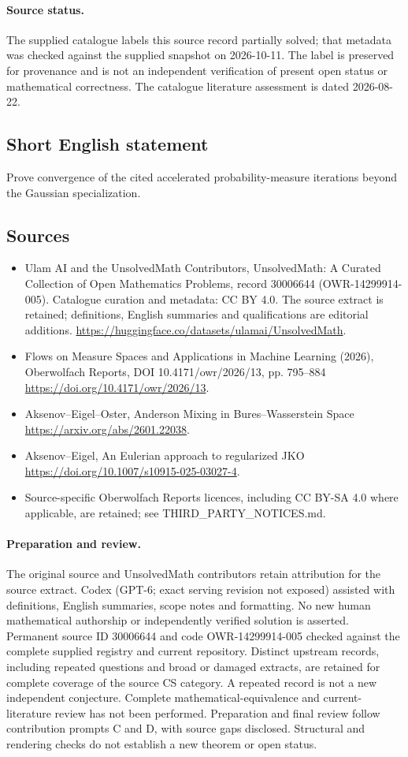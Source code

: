 \documentclass[11pt]{article}
\begin{document}
\paragraph{Source status.}
The supplied catalogue labels this source record partially solved; that metadata was checked against the supplied snapshot on 2026-10-11. The label is preserved for provenance and is not an independent verification of present open status or mathematical correctness. The catalogue literature assessment is dated 2026-08-22.
\subsection{Short English statement}
Prove convergence of the cited accelerated probability-measure iterations beyond the Gaussian specialization.
\subsection{Sources}
\begin{itemize}
\item[S1] Ulam AI and the UnsolvedMath Contributors, UnsolvedMath: A Curated Collection of Open Mathematics Problems, record 30006644 (OWR-14299914-005). Catalogue curation and metadata: CC BY 4.0. The source extract is retained; definitions, English summaries and qualifications are editorial additions.
\url{https://huggingface.co/datasets/ulamai/UnsolvedMath}.
\item[S2] Flows on Measure Spaces and Applications in Machine Learning (2026), Oberwolfach Reports, DOI 10.4171/owr/2026/13, pp. 795--884
\url{https://doi.org/10.4171/owr/2026/13}.
\item[S3] Aksenov--Eigel--Oster, Anderson Mixing in Bures--Wasserstein Space
\url{https://arxiv.org/abs/2601.22038}.
\item[S4] Aksenov--Eigel, An Eulerian approach to regularized JKO
\url{https://doi.org/10.1007/s10915-025-03027-4}.
\item Source-specific Oberwolfach Reports licences, including CC BY-SA 4.0 where applicable, are retained; see THIRD\_PARTY\_NOTICES.md.
\end{itemize}
\paragraph{Preparation and review.}
The original source and UnsolvedMath contributors retain attribution for the source extract. Codex (GPT-6; exact serving revision not exposed) assisted with definitions, English summaries, scope notes and formatting. No new human mathematical authorship or independently verified solution is asserted. Permanent source ID 30006644 and code OWR-14299914-005 checked against the complete supplied registry and current repository. Distinct upstream records, including repeated questions and broad or damaged extracts, are retained for complete coverage of the source CS category. A repeated record is not a new independent conjecture. Complete mathematical-equivalence and current-literature review has not been performed. Preparation and final review follow contribution prompts C and D, with source gaps disclosed. Structural and rendering checks do not establish a new theorem or open status.
\label{end:30006644}
\end{document}

